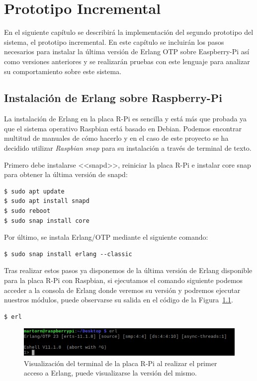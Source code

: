\chapter{Prototipo Incremental}

En el siguiente capítulo se describirá la implementación del segundo prototipo del sistema, el prototipo incremental. En este capítulo se incluirán los pasos necesarios para instalar la última versión de Erlang OTP sobre Easpberry-Pi así como versiones anteriores y se realizarán pruebas con este lenguaje para analizar su comportamiento sobre este sistema.

\section{Instalación de Erlang sobre Raspberry-Pi}
La instalación de Erlang en la placa R-Pi es sencilla y está más que probada ya que el sistema operativo Raspbian está basado en Debian. Podemos encontrar multitud de manuales de cómo hacerlo y en el caso de este proyecto se ha decidido utilizar \textit{Raspbian snap} para su instalación a través de terminal de texto.

Primero debe instalarse <<snapd>>, reiniciar la placa R-Pi e instalar core snap para obtener la última versión de snapd:
\begin{lstlisting}[style=terminal]
$ sudo apt update
$ sudo apt install snapd
$ sudo reboot
$ sudo snap install core
\end{lstlisting}

Por último, se instala Erlang/OTP mediante el siguiente comando:
\begin{lstlisting}[style=terminal]
$ sudo snap install erlang --classic
\end{lstlisting}

Tras realizar estos pasos ya disponemos de la última versión de Erlang disponible para la placa R-Pi con Raspbian, si ejecutamos el comando siguiente podemos acceder a la consola de Erlang donde veremos su versión y podremos ejecutar nuestros módulos, puede observarse su salida en el código de la Figura~\ref{fig:erlangRasp}.

\begin{lstlisting}[style=terminal]
$ erl
\end{lstlisting}

\begin{figure}[h]
\centering
\includegraphics[scale=0.8]{images/erlangRaspberry.png}
\caption[Primer acceso a Erlang en Raspberry-Pi]{Visualización del terminal de la placa R-Pi al realizar el primer acceso a Erlang, puede visualizarse la versión del mismo.}%
\label{fig:erlangRasp}
\end{figure}


